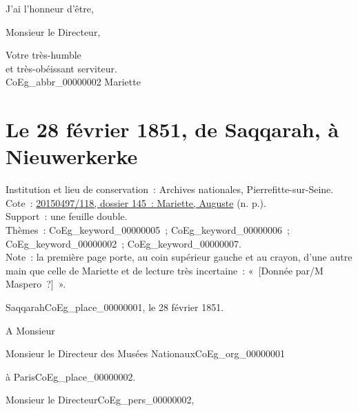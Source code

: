 \documentclass{book}
\begin{document}
\par J’ai l’honneur d’être,
\begin{center} Monsieur le Directeur,\end{center}
\begin{center} \hspace{5cm}Votre très-humble\\
\hspace{5cm}et très-obéissant serviteur.\\
\hspace{5cm} \gls{CoEg_abbr_00000002} Mariette\\
 \end{center}
 
\hypertarget{CoEg_Mariette_1851-02-28}{}
\section*{Le 28 février 1851, de Saqqarah, à Nieuwerkerke}
{\footnotesize
\noindent Institution et lieu de conservation~: Archives nationales, Pierrefitte-sur-Seine.\\
Cote~: \hyperlink{CoEg_Mariette_ms_001}{20150497/118, dossier 145~: Mariette, Auguste} (n. p.).\\
Support~: une feuille double.\\
Thèmes~: \gls{CoEg_keyword_00000005}~;  \gls{CoEg_keyword_00000006}~;  \gls{CoEg_keyword_00000002}~;  \gls{CoEg_keyword_00000007}.\\
Note~: la première page porte, au coin supérieur gauche et au crayon, d’une autre main que celle de Mariette et de lecture très incertaine~: «~[Donnée par/M Maspero~?]~».}
\begin{flushright}
Saqqarah\gls{CoEg_place_00000001}, le 28 février 1851.
\end{flushright}
A Monsieur
\begin{center} Monsieur le Directeur des Musées Nationaux\gls{CoEg_org_00000001}\end{center}
\begin{flushright}à Paris\gls{CoEg_place_00000002}.\end{flushright}

\hspace{1cm} Monsieur le Directeur\gls{CoEg_pers_00000002},\\
\end{document}
